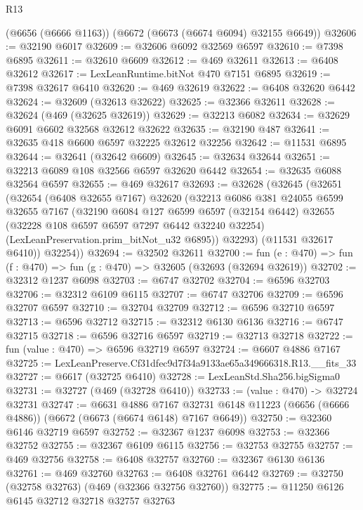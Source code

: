 \begin{lexlean}{R13}
\begin{coremodule}
    (@6656 (@6666 @1163))
    (@6672 (@6673 (@6674 @6094) @32155 @6649))
@32606 := @32190 @6017
@32609 := @32606 @6092 @32569 @6597
@32610 := @7398 @6895
@32611 := @32610 @6609
@32612 := @469 @32611
@32613 := @6408 @32612
@32617 := LexLeanRuntime.bitNot @470 @7151 @6895
@32619 := @7398 @32617 @6410
@32620 := @469 @32619
@32622 := @6408 @32620 @6442
@32624 := @32609 (@32613 @32622)
@32625 := @32366 @32611
@32628 := @32624 (@469 (@32625 @32619))
@32629 := @32213 @6082
@32634 := @32629 @6091 @6602 @32568 @32612 @32622
@32635 := @32190 @487
@32641 := @32635 @418 @6600 @6597 @32225 @32612 @32256
@32642 := @11531 @6895
@32644 := @32641 (@32642 @6609)
@32645 := @32634 @32644
@32651 := @32213 @6089 @108 @32566 @6597 @32620 @6442
@32654 := @32635 @6088 @32564 @6597
@32655 := @469 @32617
@32693 := @32628
    (@32645
      (@32651
        (@32654
          (@6408 @32655 @7167)
          @32620
          (@32213
            @6086
            @381
            @24055
            @6599
            @32655
            @7167
            (@32190
              @6084
              @127
              @6599
              @6597
              (@32154 @6442)
              @32655
              (@32228 @108 @6597 @6597 @7297 @6442 @32240 @32254)
              (LexLeanPreservation.prim_bitNot_u32 @6895))
            @32293)
          (@11531 @32617 @6410))
        @32254))
@32694 := @32502 @32611
@32700 := fun (e : @470) => fun (f : @470) => fun (g : @470) => @32605 (@32693 (@32694 @32619))
@32702 := @32312 @1237 @6098
@32703 := @6747 @32702
@32704 := @6596 @32703
@32706 := @32312 @6109 @6115
@32707 := @6747 @32706
@32709 := @6596 @32707 @6597
@32710 := @32704 @32709
@32712 := @6596 @32710 @6597
@32713 := @6596 @32712
@32715 := @32312 @6130 @6136
@32716 := @6747 @32715
@32718 := @6596 @32716 @6597
@32719 := @32713 @32718
@32722 := fun (value : @470) => @6596 @32719 @6597
@32724 := @6607 @4886 @7167
@32725 := LexLeanPreserve.Cf31dfec9d7f34a9133ae65a349666318.R13.__fits_33
@32727 := @6617 (@32725 @6410)
@32728 := LexLeanStd.Sha256.bigSigma0
@32731 := @32727 (@469 (@32728 @6410))
@32733 := (value : @470) -> @32724 @32731
@32747 := @6631
    @4886
    @7167
    @32731
    @6148
    @11223
    (@6656 (@6666 @4886))
    (@6672 (@6673 (@6674 @6148) @7167 @6649))
@32750 := @32360 @6146 @32719 @6597
@32752 := @32367 @1237 @6098
@32753 := @32366 @32752
@32755 := @32367 @6109 @6115
@32756 := @32753 @32755
@32757 := @469 @32756
@32758 := @6408 @32757
@32760 := @32367 @6130 @6136
@32761 := @469 @32760
@32763 := @6408 @32761 @6442
@32769 := @32750 (@32758 @32763) (@469 (@32366 @32756 @32760))
@32775 := @11250 @6126 @6145 @32712 @32718 @32757 @32763

\end{coremodule}
\end{lexlean}
